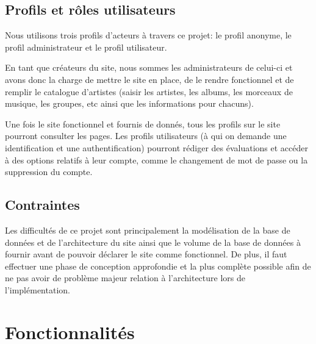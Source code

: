     \subsection{Profils et rôles utilisateurs}

        \begin{paragraphe}
            Nous utilisons trois profils d’acteurs à travers ce projet: le profil
            anonyme, le profil administrateur et le profil utilisateur.
        \end{paragraphe}

        \begin{paragraphe}
            En tant que créateurs du site, nous sommes les administrateurs de celui-ci
            et avons donc la charge de mettre le site en place, de le rendre
            fonctionnel et de remplir le catalogue d'artistes (saisir les artistes, les
            albums, les morceaux de musique, les groupes, etc ainsi que les informations pour chacuns).
        \end{paragraphe}

        \begin{paragraphe}
            Une fois le site fonctionnel et fournis de donnés, tous les profils sur le site pourront
            consulter les pages.
            Les profils utilisateurs (à qui on demande une identification et une authentification) 
            pourront rédiger des évaluations et accéder à des options relatifs à leur compte, comme le changement de mot
            de passe ou la suppression du compte.
        \end{paragraphe}

    \subsection{Contraintes}

        \begin{paragraphe}
            Les difficultés de ce projet sont principalement la modélisation de la base de données et de l'architecture du site
             ainsi que le volume de la base de données à fournir avant de pouvoir déclarer le site comme
            fonctionnel. De plus, il faut effectuer une phase de conception approfondie et la 
            plus complète possible afin de ne pas avoir de problème majeur relation à l'architecture lors de l'implémentation.
        \end{paragraphe}
        
\newpage

\section{Fonctionnalités}

